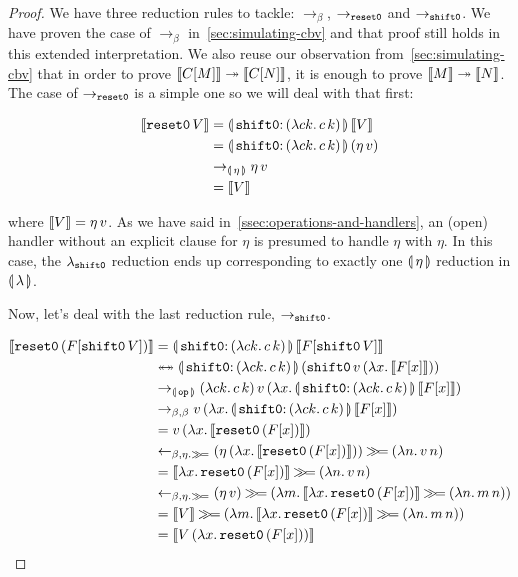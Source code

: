 \begin{proof}
We have three reduction rules to tackle: $\to_\beta$, $\to_{\mathtt{reset0}}$ and
$\to_{\mathtt{shift0}}$. We have proven the case of $\to_\beta$
in~\ref{sec:simulating-cbv} and that proof still holds in this extended
interpretation. We also reuse our observation
from~\ref{sec:simulating-cbv} that in order to prove $\llbracket C[M] \rrbracket \twoheadrightarrow
\llbracket C[N] \rrbracket$, it is enough to prove $\llbracket M \rrbracket \twoheadrightarrow \llbracket N \rrbracket$. The case of
$\to_{\mathtt{reset0}}$ is a simple one so we will deal with that first:

\NoChapterPrefix
\begin{align}
  \sem{\ap{\reseto}{V}}
  &= \ap{\resetobanana}{\sem{V}} \\
  &= \ap{\resetobanana}{(\ap{\eta}{v})} \\
  &\to_{\banana{\eta}} \ap{\eta}{v} \\
  &= \sem{V}
\end{align}
\setcounter{equation}{0}
\ChapterPrefix

where $\llbracket V \rrbracket = \eta\,v$. As we have said
in~\ref{ssec:operations-and-handlers}, an (open) handler without an
explicit clause for $\eta$ is presumed to handle $\eta$ with $\eta$. In
this case, the $\lambda_{\mathtt{shift0}}$ reduction ends up corresponding to exactly
one $\llparenthesis \, \eta \, \rrparenthesis$ reduction in $\llparenthesis \, \lambda \, \rrparenthesis$.

Now, let's deal with the last reduction rule, $\to_{\mathtt{shift0}}$.

\NoChapterPrefix
\begin{align}
  \sem{\ap{\reseto}{(F[\ap{\shifto}{V}])}}
  &= \ap{\resetobanana}{\sem{F[\ap{\shifto}{V}]}} \\
  &\ttoffrom \ap{\resetobanana}{(\app{\op{shift0}}{v}{(\lam{x}{\sem{F[x]}})})} \\
  &\to_{\banana{\op{op}}} \app{(\lam{c k}{\ap{c}{k}})}{v}{(\lam{x}{\ap{\resetobanana}{\sem{F[x]}}})} \\
  &\to_{\beta,\beta} \ap{v}{(\lam{x}{\ap{\resetobanana}{\sem{F[x]}}})} \\
  &= \ap{v}{(\lam{x}{\sem{\ap{\reseto}{(F[x])}}})} \\
  &\from_{\beta,\eta.\hsbind} (\ap{\eta}{(\lam{x}{\sem{\ap{\reseto}{(F[x])}}})}) \hsbind (\lam{n}{\ap{v}{n}}) \\
  &= \sem{\lam{x}{\ap{\reseto}{(F[x])}}} \hsbind (\lam{n}{\ap{v}{n}}) \\
  &\from_{\beta,\eta.\hsbind} (\ap{\eta}{v}) \hsbind (\lam{m}{\sem{\lam{x}{\ap{\reseto}{(F[x])}}} \hsbind (\lam{n}{\ap{m}{n}})}) \\
  &= \sem{V} \hsbind (\lam{m}{\sem{\lam{x}{\ap{\reseto}{(F[x])}}} \hsbind (\lam{n}{\ap{m}{n}})}) \\
  &= \sem{\ap{V}{(\lam{x}{\ap{\reseto}{(F[x])}})}}
\end{align}
\setcounter{equation}{0}
\ChapterPrefix


\end{proof}
